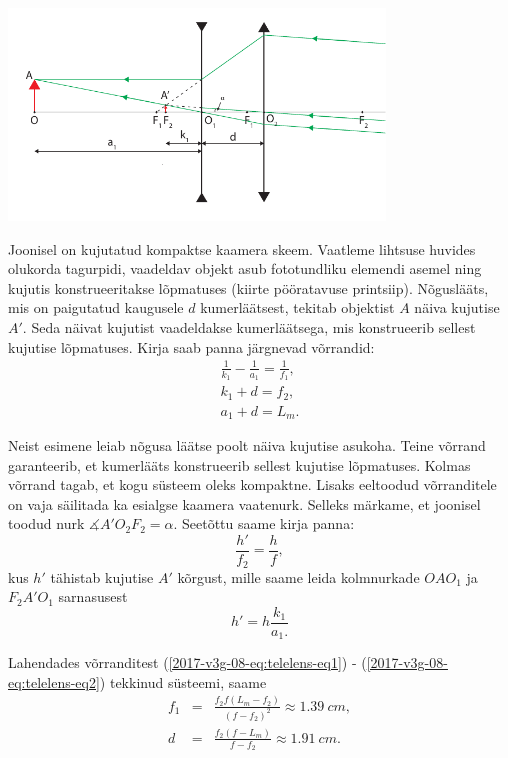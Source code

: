 \documentclass[11pt, twoside]{article}
\begin{document}
{{\begin{center}
	\includegraphics[width=10cm]{2017-v3g-08-skeem__telephoto.pdf}
\end{center}
Joonisel on kujutatud kompaktse kaamera skeem. Vaatleme lihtsuse huvides
olukorda tagurpidi, vaadeldav objekt asub fototundliku elemendi asemel
ning kujutis konstrueeritakse lõpmatuses (kiirte pööratavuse printsiip).
Nõguslääts, mis on paigutatud kaugusele $d$ kumerläätsest, tekitab
objektist $A$ näiva kujutise $A'$. Seda näivat kujutist vaadeldakse
kumerläätsega, mis konstrueerib sellest kujutise lõpmatuses. Kirja
saab panna järgnevad võrrandid:
\begin{eqnarray}
\frac{1}{k_{1}}-\frac{1}{a_{1}} = \frac{1}{f_{1}}, \label{2017-v3g-08-eq:telelens-eq1}\\
k_{1}+d = f_{2},\\
a_{1}+d = L_{m}.
\end{eqnarray}

\noindent Neist esimene leiab nõgusa läätse poolt näiva kujutise asukoha.
Teine võrrand garanteerib, et kumerlääts konstrueerib sellest kujutise
lõpmatuses. Kolmas võrrand tagab, et kogu süsteem oleks kompaktne.
Lisaks eeltoodud võrranditele on vaja säilitada ka esialgse kaamera
vaatenurk. Selleks märkame, et joonisel toodud nurk $\measuredangle A'O_{2}F_{2}=\alpha.$
Seetõttu saame kirja panna:
\begin{equation}
\frac{h'}{f_{2}}=\frac{h}{f},
\end{equation}
\noindent kus $h'$ tähistab kujutise $A'$ kõrgust, mille saame leida
kolmnurkade $OAO_{1}$ ja $F_{2}A'O_{1}$ sarnasusest
\begin{equation}
h'=h\frac{k_{1}}{a_{1}.}\label{2017-v3g-08-eq:telelens-eq2}
\end{equation}

Lahendades võrranditest (\ref{2017-v3g-08-eq:telelens-eq1}) - (\ref{2017-v3g-08-eq:telelens-eq2})
tekkinud süsteemi, saame
\begin{eqnarray*}
f_{1} & = & \frac{f_{2}f(L_{m}-f_{2})}{\left(f-f_{2}\right)^{2}}\approx\SI{1.39}{cm},\\
d & = & \frac{f_{2}(f-L_{m})}{f-f_{2}}\approx\SI{1.91}{cm}.
\end{eqnarray*}
\fi
}

}
\end{document}
